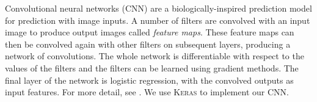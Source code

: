 \documentclass[fleqn,usenatbib,usedcolumn]{mnras}
\begin{document}
      Convolutional neural networks (CNN) are a biologically-inspired prediction
      model for prediction with image inputs. A number of filters are convolved
      with an input image to produce output images called \emph{feature maps}.
      These feature maps can then be convolved again with other filters on
      subsequent layers, producing a network of convolutions. The whole network
      is differentiable with respect to the values of the filters and the
      filters can be learned using gradient methods. The final layer of the
      network is logistic regression, with the convolved outputs as input
      features. For more detail, see \citet[subsection II.A][]{lecun98}. We use
      \textsc{Keras} \citep{chollet15keras} to implement our CNN.

\end{document}
